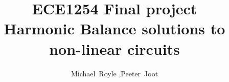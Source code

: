 \documentclass[12pt,journal,compsoc]{../ieeepaper/IEEEtran}
\begin{document}
%
\title{ECE1254 Final project \\ 
Harmonic Balance solutions to non-linear circuits
}
%
%
%
%

\author{ Michael~Royle%
   ,Peeter~Joot%
}
\end{document}
